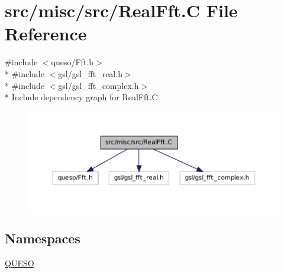 \hypertarget{_real_fft_8_c}{\section{src/misc/src/\-Real\-Fft.C File Reference}
\label{_real_fft_8_c}
}
{\ttfamily \#include $<$queso/\-Fft.\-h$>$}\\*
{\ttfamily \#include $<$gsl/gsl\-\_\-fft\-\_\-real.\-h$>$}\\*
{\ttfamily \#include $<$gsl/gsl\-\_\-fft\-\_\-complex.\-h$>$}\\*
Include dependency graph for Real\-Fft.\-C\-:
\nopagebreak
\begin{figure}[H]
\begin{center}
\leavevmode
\includegraphics[width=350pt]{_real_fft_8_c__incl}
\end{center}
\end{figure}
\subsection*{Namespaces}
\begin{DoxyCompactItemize}
\item 
\hyperlink{namespace_q_u_e_s_o}{Q\-U\-E\-S\-O}
\end{DoxyCompactItemize}
